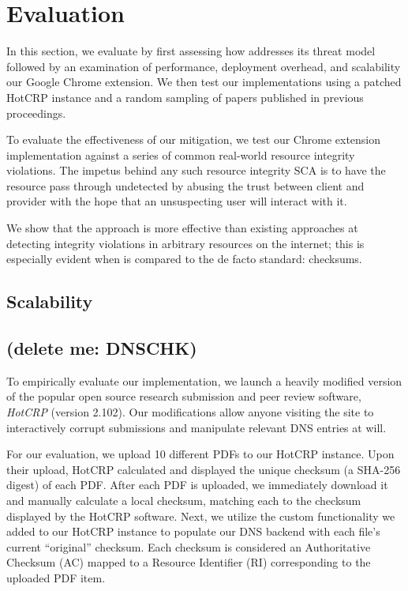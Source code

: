 \section{Evaluation} \label{sec:evaluation}


In this section, we evaluate \SYSTEM{} by first assessing how \SYSTEM{}
addresses its threat model followed by an examination of performance, deployment
overhead, and scalability our Google Chrome extension. We then test our
implementations using a patched HotCRP instance and a random sampling of papers
published in previous \CONFERENCE{} proceedings.

To evaluate the effectiveness of our mitigation, we test our \SYSTEM{} Chrome
extension implementation against a series of common real-world resource
integrity violations. The impetus behind any such resource integrity SCA is to
have the resource pass through undetected by abusing the trust between client
and provider with the hope that an unsuspecting user will interact with it.

We show that the \SYSTEM{} approach is more effective than existing approaches
at detecting integrity violations in arbitrary resources on the internet; this
is especially evident when \SYSTEM{} is compared to the de facto standard:
checksums.

\subsection{Scalability}


\subsection{(delete me: DNSCHK)}

To empirically evaluate our implementation, we launch a heavily modified version
of the popular open source research submission and peer review software,
\emph{HotCRP} (version 2.102). Our modifications allow anyone visiting the site
to interactively corrupt submissions and manipulate relevant DNS entries at
will.

For our evaluation, we upload 10 different \CONFERENCE{} PDFs to our HotCRP
instance. Upon their upload, HotCRP calculated and displayed the unique checksum
(a SHA-256 digest) of each PDF. After each PDF is uploaded, we immediately
download it and manually calculate a local checksum, matching each to the
checksum displayed by the HotCRP software. Next, we utilize the custom
functionality we added to our HotCRP instance to populate our DNS backend with
each file's current ``original'' checksum. Each checksum is considered an
Authoritative Checksum (AC) mapped to a Resource Identifier (RI) corresponding
to the uploaded PDF item.

